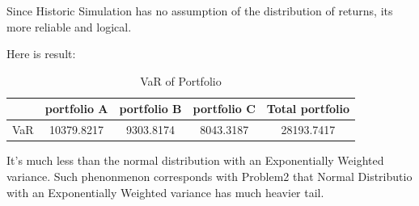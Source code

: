 \documentclass[11pt,en]{elegantpaper}
\begin{document}
Since Historic Simulation has no assumption of the distribution of returns, its more reliable and logical.

Here is result:

\begin{table}[htbp]
    \centering
    \caption{VaR of Portfolio}
    \label{table4}
    \begin{tabular}{@{}ccccc@{}}
        \toprule
        \textbf{} & \textbf{portfolio A} & \textbf{portfolio B} & \textbf{portfolio C} & \textbf{Total portfolio}\\
        \midrule
        VaR & 10379.8217  & 9303.8174 & 8043.3187 & 28193.7417 \\
        \bottomrule
    \end{tabular}
\end{table}

It's much less than the normal distribution with an Exponentially Weighted variance. Such phenonmenon corresponds with Problem2 that
Normal Distributio with an Exponentially Weighted variance has much heavier tail.
\end{document}
